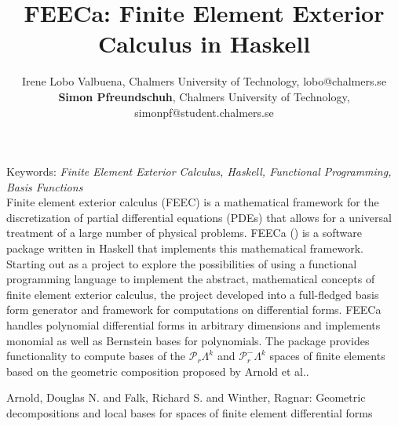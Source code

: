 \documentclass[11pt,a4paper]{article}
\begin{document}
\thispagestyle{empty}

\title{FEECa: Finite Element Exterior Calculus in Haskell}

\author{Irene Lobo Valbuena, Chalmers University of Technology, lobo@chalmers.se \\
        \textbf{Simon Pfreundschuh}, Chalmers University of Technology, simonpf@student.chalmers.se}

\date{} %
\maketitle\thispagestyle{empty}

Keywords: \emph{Finite Element Exterior Calculus, Haskell, Functional Programming,
  Basis Functions}\\


Finite element exterior calculus (FEEC) is a mathematical framework
for the discretization of partial differential equations (PDEs) that
allows for a universal treatment of a large number of physical
problems.  FEECa (\textipa{["fi:ka]}) is a software package written in
Haskell that implements this mathematical framework. Starting out as a
project to explore the possibilities of using a functional programming
language to implement the abstract, mathematical concepts of finite
element exterior calculus, the project developed into a full-fledged
basis form generator and framework for computations on differential
forms. FEECa handles polynomial differential forms in arbitrary
dimensions and implements monomial as well as Bernstein bases for
polynomials. The package provides functionality to compute bases of
the $\mathcal{P}_r\Lambda^k$ and $\mathcal{P}^-_r\Lambda^k$ spaces of
finite elements based on the geometric composition proposed by Arnold
et al.\cite{arnold}.

\begin{thebibliography}{00}
 Arnold, Douglas N. and Falk, Richard S. and Winther, Ragnar:
 Geometric decompositions and local bases for spaces of finite element differential forms
\end{thebibliography}
\end{document}

